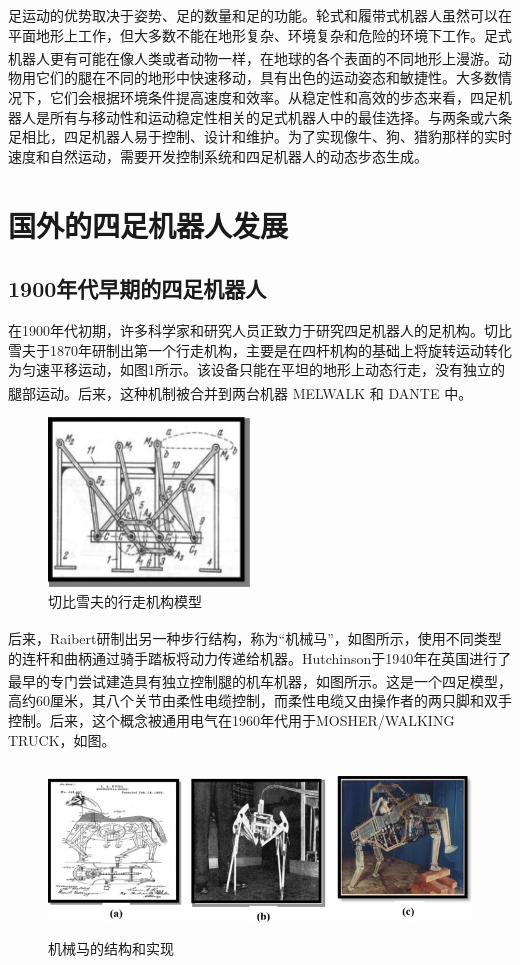 \documentclass[12pt,a4paper]{ctexart}
\newcommand{\supercite}[1]{\textsuperscript{\cite{#1}}}
\begin{document}
足运动的优势取决于姿势、足的数量和足的功能。轮式和履带式机器人虽然可以在平面地形上工作，但大多数不能在地形复杂、环境复杂和危险的环境下工作。足式机器人更有可能在像人类或者动物一样\supercite{3}，在地球的各个表面的不同地形上漫游。动物用它们的腿在不同的地形中快速移动，具有出色的运动姿态和敏捷性。大多数情况下，它们会根据环境条件提高速度和效率。从稳定性和高效的步态来看，四足机器人是所有与移动性和运动稳定性相关的足式机器人中的最佳选择。与两条或六条足相比，四足机器人易于控制、设计和维护。为了实现像牛、狗、猎豹那样的实时速度和自然运动，需要开发控制系统和四足机器人的动态步态生成。
\section{国外的四足机器人发展}
\subsection{1900年代早期的四足机器人}
在1900年代初期，许多科学家和研究人员正致力于研究四足机器人的足机构。切比雪夫于1870年研制出第一个行走机构，主要是在四杆机构的基础上将旋转运动转化为匀速平移运动，如图1所示。该设备只能在平坦的地形上动态行走，没有独立的腿部运动。后来，这种机制被合并到两台机器 MELWALK 和 DANTE \supercite{4}中。
\begin{figure}[H]
	\centering
	\includegraphics[height=4.5cm]{IMG_01.jpg}
	\caption{切比雪夫的行走机构模型}
\end{figure}
后来，Raibert研制出另一种步行结构，称为“机械马”\supercite{5}，如图所示，使用不同类型的连杆和曲柄通过骑手踏板将动力传递给机器。Hutchinson于1940年在英国进行了最早的专门尝试建造具有独立控制腿的机车机器\supercite{6}，如图所示。这是一个四足模型，高约60厘米，其八个关节由柔性电缆控制，而柔性电缆又由操作者的两只脚和双手控制。后来，这个概念被通用电气在1960年代用于MOSHER/WALKING TRUCK，如图。
\begin{figure}[H]
	\centering
	\includegraphics[height=4.5cm]{IMG_02.jpg}
	\caption{机械马的结构和实现}
\end{figure}
\end{document}
